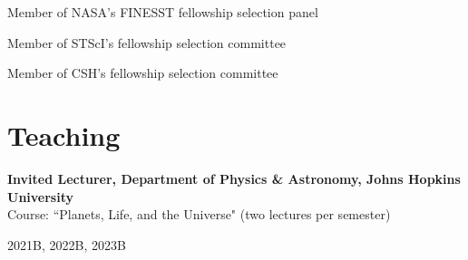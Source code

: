 \documentclass[12pt, a4paper]{article} %
\begin{document}
\vspace{0.2cm}

\begin{minipage}[t]{0.7\textwidth}
\begin{flushleft}%
  \setlength{\leftskip}{0.2cm}%
Member of NASA's FINESST fellowship selection panel
\end{flushleft}
\end{minipage}
\begin{minipage}[t]{0.3\textwidth}
\hfill 
\end{minipage}

\vspace{0.2cm}

\begin{minipage}[t]{0.7\textwidth}
\begin{flushleft}%
  \setlength{\leftskip}{0.2cm}%
Member of STScI's fellowship selection committee
\end{flushleft}
\end{minipage}
\begin{minipage}[t]{0.3\textwidth}
\hfill 
\end{minipage}

\vspace{0.2cm}

\begin{minipage}[t]{0.7\textwidth}
\begin{flushleft}%
  \setlength{\leftskip}{0.2cm}%
Member of CSH's fellowship selection committee
\end{flushleft}
\end{minipage}
\begin{minipage}[t]{0.3\textwidth}
\hfill 
\end{minipage}

\section*{Teaching}

\begin{minipage}[t]{0.7\textwidth}
\begin{flushleft}%
  \setlength{\leftskip}{0.2cm}%
\textbf{Invited Lecturer, Department of Physics \& Astronomy, Johns Hopkins University}\\
Course: ``Planets, Life, and the Universe" (two lectures per semester)
\end{flushleft}
\end{minipage}
\begin{minipage}[t]{0.3\textwidth}
\hfill 2021B, 2022B, 2023B
\end{minipage}\\
\end{document}

